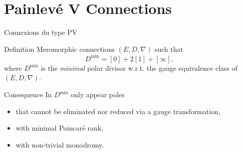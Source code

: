 \documentclass[10pt,xcolor=svgnames]{beamer} %
\newcommand{\1}{\mathbbm{1}}
\begin{document}
\section{Painlevé V Connections}















\begin{frame}{Connexions du type PV}
	\begin{exampleblock}{Definition}
		Meromorphic connections $(E, D, \nabla)$ such that
		\[D^{\text{min}}=[0]+2[1]+[\infty],\]
		where $D^{\text{min}}$ is the \textit{minimal} polar divisor w.r.t. the gauge equivalence class of  $(E, D, \nabla)$.
	\end{exampleblock}
	\vfill
	\begin{exampleblock}{Consequence}
		In $D^{\text{min}}$ only appear poles
		\begin{itemize}
			\item that cannot be eliminated nor reduced via a gauge transformation,
			\item with minimal Poincaré rank,
			\item with non-trivial monodromy.
		\end{itemize}
	\end{exampleblock}
\end{frame}
\end{document}
